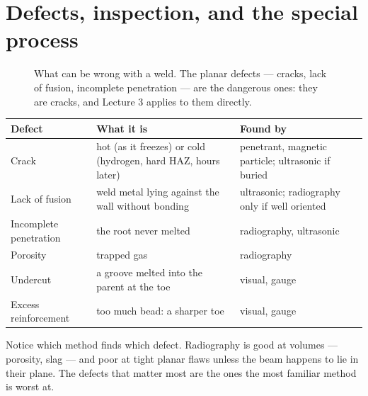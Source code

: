 \documentclass[11pt,a4paper]{article}
\begin{document}
\section{Defects, inspection, and the special process}
\label{sec:process}

\begin{figure}[H]\centering
\resizebox{0.86\textwidth}{!}{}
\caption{What can be wrong with a weld. The planar defects --- cracks, lack of fusion, incomplete
penetration --- are the dangerous ones: they are cracks, and Lecture 3 applies to them directly.}
\label{fig:defects}
\end{figure}

\begin{center}\footnotesize
\begin{tabular}{@{}p{3.3cm}p{6.3cm}p{5.4cm}@{}}
\toprule
\textbf{Defect} & \textbf{What it is} & \textbf{Found by}\\
\midrule
Crack & hot (as it freezes) or cold (hydrogen, hard HAZ, hours later) & penetrant, magnetic
  particle; ultrasonic if buried\\[2pt]
Lack of fusion & weld metal lying against the wall without bonding & ultrasonic; radiography
  only if well oriented\\[2pt]
Incomplete penetration & the root never melted & radiography, ultrasonic\\[2pt]
Porosity & trapped gas & radiography\\[2pt]
Undercut & a groove melted into the parent at the toe & visual, gauge\\[2pt]
Excess reinforcement & too much bead: a sharper toe & visual, gauge\\
\bottomrule
\end{tabular}
\end{center}

\noindent Notice which method finds which defect. Radiography is good at volumes --- porosity, slag
--- and poor at tight planar flaws unless the beam happens to lie in their plane. The defects that
matter most are the ones the most familiar method is worst at.
\end{document}
